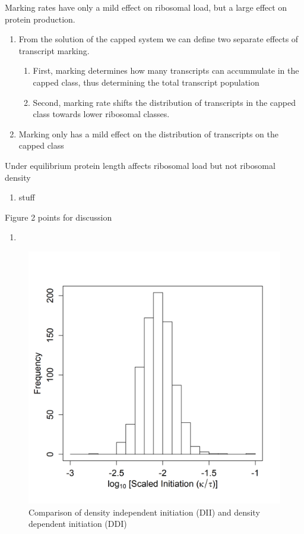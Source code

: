 \documentclass[review]{elsarticle}
\begin{document}
	Marking rates have only a mild effect on ribosomal load, but a large effect on protein production.
	\begin{enumerate}
		\item From the solution of the capped system we can define two separate effects of transcript marking.
		\begin{enumerate}
			\item  First, marking determines how many transcripts can accummulate in the capped class, thus determining the total transcript population		
			\item Second, marking rate shifts the distribution of transcripts  in the capped class towards lower ribosomal classes.	
		\end{enumerate}
		\item Marking only has a mild effect on the distribution of transcripts on the capped class


	\end{enumerate}
	Under equilibrium protein length affects ribosomal load but not ribosomal density
	\begin{enumerate}
		\item stuff
	\end{enumerate}



Figure 2 points for discussion

\begin{enumerate}
	\item

\end{enumerate}


\begin{figure}[ht]
\centering
\includegraphics[width=\textwidth/2]{Images/Scaled_initiation_histogram_DUC_pgen_2018.png}
\caption{Comparison of density independent initiation (DII) and density dependent initiation (DDI)}
\end{figure}
\end{document}

